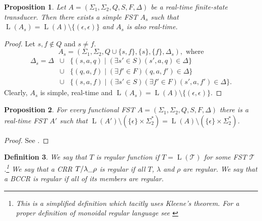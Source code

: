 \documentclass{article}
\newtheorem{definition}{Definition}[section]
\newtheorem{proposition}[definition]{Proposition}
\DeclareMathOperator{\Lang}{L}
\begin{document}
	\begin{proposition} \label{prop:simple_FST}
		Let $A = (\Sigma_1, \Sigma_2, Q, S, F, \Delta)$ be a real-time finite-state transducer.
		Then there exists a simple FST $A_s$ such that $\Lang(A_s) = \Lang(A)\setminus \{ (\epsilon, \epsilon) \}$ and $A_s$ is also real-time.
	\end{proposition}
	\begin{proof}
		Let $s,f\notin Q$ and $s\ne f$.
		\[ A_s = (\Sigma_1, \Sigma_2, Q\cup\{s,f\}, \{s\}, \{f\}, \Delta_s), \text{ where} \]
		\begin{eqnarray*}
			\Delta_s = \Delta & \cup & \{ (s,a,q)\mid (\exists s'\in S)(s',a,q)\in\Delta \} \\
			& \cup & \{ (q,a,f)\mid (\exists f'\in F)(q,a,f')\in\Delta \} \\
			& \cup & \{ (s,a,f)\mid (\exists s'\in S)(\exists f'\in F)(s',a,f')\in\Delta \}.
		\end{eqnarray*}
		Clearly, $A_s$ is simple, real-time and $\Lang(A_s) = \Lang(A)\setminus \{ (\epsilon, \epsilon) \}$.
	\end{proof}

	\begin{proposition} \label{prop:real-time}
		For every functional FST $A = (\Sigma_1, \Sigma_2, Q, S, F, \Delta)$ there is a real-time FST $A'$ such that $\Lang(A')\setminus(\{\epsilon\}\times\Sigma_2^*) = \Lang(A)\setminus(\{\epsilon\}\times\Sigma_2^*)$.
	\end{proposition}
	\begin{proof}
		See \cite[proposition~4.4.8]{Mihov-FST-2019}.
	\end{proof}
	
	\begin{definition} \label{def:regular}
		We say that $T$ is regular function if $T=\Lang(\mathcal{T})$ for some FST $\mathcal{T}$.\footnote{This is a simplified definition which tacitly uses Kleene's theorem. For a proper definition of monoidal regular language see \cite[definition~2.3.1]{Mihov-FST-2019}}
		We say that a CRR $\crr$ is regular if all $T$, $\lambda$ and $\rho$ are regular. We say that a BCCR  is regular if all of its members are regular.
	\end{definition}
\end{document}
